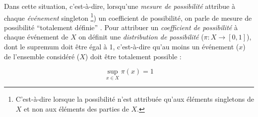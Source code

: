 Dans cette situation, c'est-à-dire, lorsqu'une \emph{mesure de
  possibilité} attribue à chaque \emph{événement} singleton
\footnote{C'est-à-dire lorsque la possibilité n'est attribuée qu'aux
  éléments singletons de \(X\) et non aux éléments des parties de
  \(X\).}) un coefficient de possibilité, on parle de mesure de
possibilité \enquote{totalement définie}
\autocite{Bouchon-Meunier2007}. Pour attribuer un \emph{coefficient de
  possibilité} à chaque événement de \(X\) on définit une
\emph{distribution de possibilité} (\(π : X → [0,1]\)), dont le
supremum doit être égal à 1, c'est-à-dire qu'au moins un événement
(\(x\)) de l'ensemble considéré (\(X\)) doit être totalement possible
:

\begin{equation}
  \sup_{x ∈ X}π(x)=1
\end{equation}

